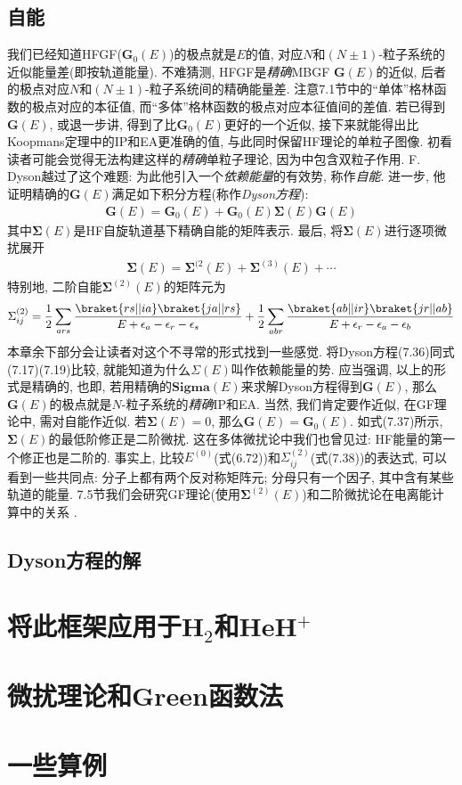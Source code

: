 \subsection{自能}
我们已经知道HFGF($\mathbf{G}_0(E)$)的极点就是$E$的值, 对应$N$和$(N\pm1)$-粒子系统的近似能量差(即按轨道能量). 不难猜测, HFGF是\emph{精确}MBGF $\mathbf{G}(E)$的近似, 后者的极点对应$N$和$(N\pm1)$-粒子系统间的精确能量差. 注意7.1节中的“单体”格林函数的极点对应\ha 的本征值, 而“多体”格林函数的极点对应本征值间的差值. 若已得到$\mathbf{G}(E)$, 或退一步讲, 得到了比$\mathbf{G}_0(E)$更好的一个近似, 接下来就能得出比Koopmans定理中的IP和EA更准确的值, 与此同时保留HF理论的单粒子图像. 初看读者可能会觉得无法构建这样的\emph{精确}单粒子理论, 因为\ha 中包含双粒子作用. F. Dyson越过了这个难题: 为此他引入一个\emph{依赖能量}的有效势, 称作\emph{自能}. 进一步, 他证明精确的$\mathbf{G}(E)$满足如下积分方程(称作\emph{Dyson方程}):
\begin{align}
\mathbf{G}(E) = \mathbf{G}_0(E) + \mathbf{G}_0(E)\mathbf{\Sigma}(E)\mathbf{G}(E) 
\end{align}
其中$\mathbf{\Sigma}(E)$是HF自旋轨道基下精确自能的矩阵表示. 最后, 将$\mathbf{\Sigma}(E)$进行逐项微扰展开
\begin{align}
\mathbf{\Sigma}(E) = \mathbf{\Sigma}^{(2}(E) + \mathbf{\Sigma}^{(3)}(E) + \cdots
\end{align}
特别地, 二阶自能$\mathbf{\Sigma}^{(2)}(E)$的矩阵元为
\begin{align}
\Sigma_{ij}^{(2)} = \frac{1}{2}\sum_{ars}\frac{\braket{rs||ia}\braket{ja||rs}}{E+\epsilon_a-\epsilon_r-\epsilon_s} + 
\frac{1}{2}\sum_{abr}\frac{\braket{ab||ir}\braket{jr||ab}}{E+\epsilon_r-\epsilon_a-\epsilon_b}
\end{align}
本章余下部分会让读者对这个不寻常的形式找到一些感觉. 将Dyson方程(7.36)同式(7.17)(7.19)比较, 就能知道为什么$\Sigma(E)$叫作依赖能量的势. 应当强调, 以上的形式是精确的, 也即, 若用精确的$\mathbf{Sigma}(E)$来求解Dyson方程得到$\mathbf{G}(E)$, 那么$\mathbf{G}(E)$的极点就是$N$-粒子系统的\emph{精确}IP和EA. 当然, 我们肯定要作近似, 在GF理论中, 需对自能作近似. 若$\mathbf{\Sigma}(E)=0$, 那么$\mathbf{G}(E)=\mathbf{G}_0(E)$. 如式(7.37)所示, $\mathbf{\Sigma}(E)$的最低阶修正是二阶微扰. 这在多体微扰论中我们也曾见过: HF能量的第一个修正也是二阶的. 事实上, 比较$E^{(0)}$(式(6.72))和$\Sigma_{ij}^{(2)}$(式(7.38))的表达式, 可以看到一些共同点: 分子上都有两个反对称矩阵元; 分母只有一个因子, 其中含有某些轨道的能量. 7.5节我们会研究GF理论(使用$\mathbf{\Sigma}^{(2)}(E)$)和二阶微扰论在电离能计算中的关系 . 
\subsection{Dyson方程的解}
\section{将此框架应用于H$_2$和HeH$^+$}
\section{微扰理论和Green函数法}
\section{一些算例}
\theendnotes
